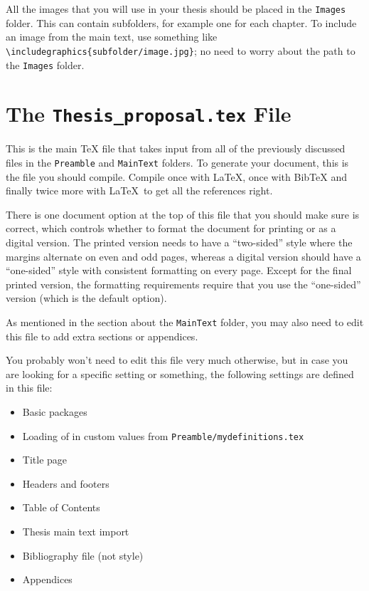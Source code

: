 All the images that you will use in your thesis should be placed in the \texttt{Images}
folder. This can contain subfolders, for example one for each chapter. To include
an image from the main text, use something like
\texttt{\textbackslash includegraphics\{subfolder/image.jpg\}}; no need to
worry about the path to the \texttt{Images} folder.

\section{The \texttt{Thesis\_proposal.tex} File}

This is the main TeX file that takes input from all of the previously discussed
files in the \texttt{Preamble} and \texttt{MainText} folders. To generate your
document, this is the file you should compile. Compile once with \LaTeX,
once with BibTeX and finally twice more with \LaTeX\ to get all the references right.

There is one document option at the top of this file that you should make
sure is correct, which controls whether to format the document for printing
or as a digital version. The printed version needs to have a ``two-sided''
style where the margins alternate on even and odd pages, whereas a digital
version should have a ``one-sided'' style with consistent formatting on every
page. Except for the final printed version, the formatting requirements
require that you use the ``one-sided'' version (which is the default option).

As mentioned in the section about the \texttt{MainText} folder, you may also
need to edit this file to add extra sections or appendices.

You probably won't need to edit this file very much otherwise, but in case
you are looking for a specific setting or something, the following settings
are defined in this file:
\begin{itemize}
    \item Basic packages
    \item Loading of in custom values from \texttt{Preamble/mydefinitions.tex}
    \item Title page
    \item Headers and footers
    \item Table of Contents
    \item Thesis main text import
    \item Bibliography file (not style)
    \item Appendices
\end{itemize}

